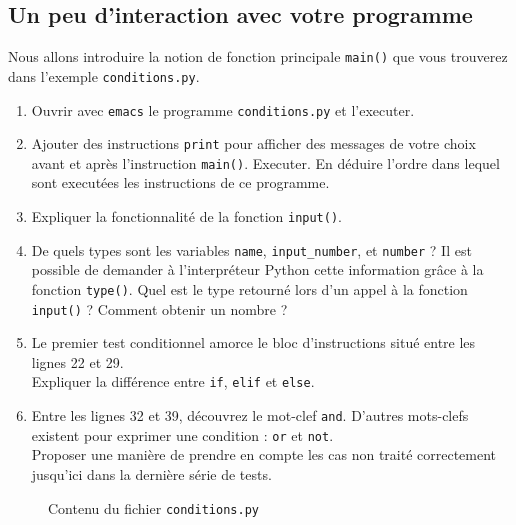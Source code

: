 \subsection{Un peu d'interaction avec votre programme}




Nous  allons introduire  la  notion de  fonction
principale   \texttt{main()}  que   vous   trouverez  dans   l'exemple
\texttt{conditions.py}.


\begin{enumerate}

\item Ouvrir avec  \texttt{emacs} le  programme \texttt{conditions.py}
  et l'executer.
\item Ajouter des instructions \verb+print+
  pour afficher des messages de votre choix avant et après
  l'instruction \verb+main()+. Executer.
  En déduire l'ordre dans lequel sont executées les instructions de
  ce programme. 
\item Expliquer la fonctionnalité de la fonction \texttt{input()}.
\item De quels types sont les variables \texttt{name},
  \texttt{input\_number},
  et \texttt{number} ?
  Il est possible de demander à l'interpréteur Python cette
  information grâce à la fonction \texttt{type()}.
  Quel est le type retourné lors d'un appel à la fonction \verb+input()+ ?
  Comment obtenir un nombre ? 


\item Le premier test conditionnel amorce le bloc d'instructions
  situé entre  les lignes 22  et 29.\\ Expliquer la  différence entre
  \texttt{if}, \texttt{elif} et \texttt{else}.

\item  Entre   les  lignes  32   et  39,  découvrez  le   mot-clef
  \texttt{and}. D'autres mots-clefs existent pour
  exprimer une condition  : \texttt{or}  et \texttt{not}.\\
  Proposer une manière de prendre en compte les cas non traité
  correctement jusqu'ici dans la dernière série de tests.
\end{enumerate}


\begin{figure}  
  
  \caption{Contenu du fichier \texttt{conditions.py}}
  \label{polynome_conditions}
\end{figure}



